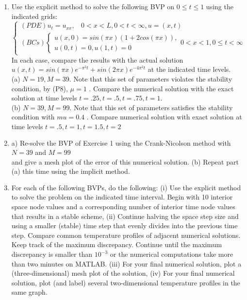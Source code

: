 \documentclass[../main.tex]{subfiles}
\begin{document}
\begin{enumerate}
	\item
		Use the explicit method to solve the following BVP on $0\leqslant t \leqslant 1$ using the indicated grids:
$$\begin{cases} 
	(PDE) u_t=u_{xx},
	~~~~0<x<L, 0<t<\infty,u=(x,t)\\
(BCs)
		\begin{cases}
		u(x,0)=sin(\pi x)(1+2cos(\pi x)),\\
		u(0,t)=0, u(1,t)=0
		\end{cases}
		0 < x < 1, 0 \leqslant t < \infty 
	\end{cases}$$
In each case, compare the results with the actual solution $ u(x,t)=sin(\pi x)e^{-\pi^2t}+sin(2\pi x)e^{-4\pi^2t}$ at the indicated time levels. 
\\
(a) $N = 19, M = 39$. Note that this set of parameters violates the stability condition, by (P8), 
 $\mu= 1$ . Compare the numerical solution with the exact solution at time levels $t = .25, t = .5,  t=.75, t= 1$. 
\\
(b) $N= 39, M= 99$. Note that this set of parameters satisfies the stability condition with $mu = 0.4$ . 
Compare numerical solution with exact solution at time levels $t = .5, t = 1, t = 1.5, t = 2$
	\item
	a) Re-solve the BVP of Exercise 1 using the Crank-Nicolson method with $N = 39$ and $M=99$ 
\\
and give a mesh plot of the error of this numerical solution. 
(b) Repeat part (a) this time using the implicit method. 
	\item
	For each of the following BVPs, do the following: (i) Use the explicit method to solve the problem on the indicated time interval. Begin with 10 interior space node values and a corresponding number of interior time node values that results in a stable scheme, (ii) Continue halving the space step size and using a smaller (stable) time step that evenly divides into the previous time step. Compare common temperature profiles of adjacent numerical solutions. Keep track of the maximum discrepancy. Continue until the maximum discrepancy is smaller than $10^{-3}$ or the numerical computations take more than two minutes on MATLAB. (iii) For your final numerical solution, plot a (three-dimensional) mesh plot of the solution, (iv) For your final numerical solution, plot (and label) several two-dimensional temperature profiles in the same graph.
\\
\\	

\end{enumerate}
\end{document}
